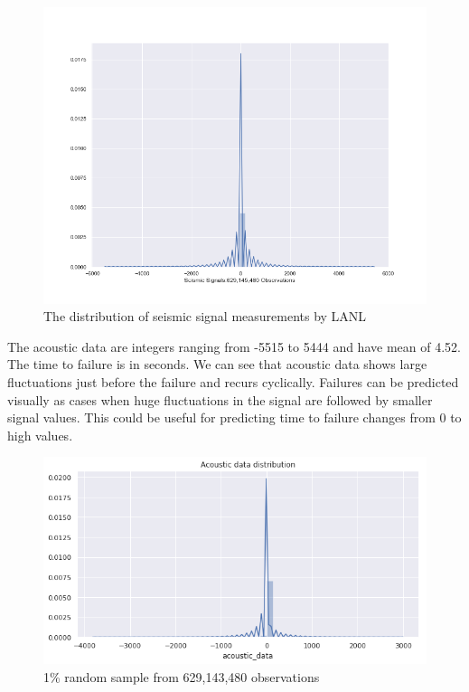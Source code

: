 \documentclass[]{llncs}
\begin{document}
\begin{figure}
	\centering
	\includegraphics[width=.8\linewidth]{../GPUProject/acousticRand60000DistPlot}
	\caption{The distribution of seismic signal measurements by LANL}
	\label{fig:acousticRand60000DistPlot}
\end{figure}
The acoustic data are integers ranging from -5515 to 5444 and have mean of 4.52. The time to failure is in seconds. We can see that acoustic data shows large fluctuations just before the failure and recurs cyclically. Failures can be predicted visually as cases when huge fluctuations in the signal are followed by smaller signal values. This could be useful for predicting time to failure changes from 0 to high values.
\begin{figure}[h]
	\centering
	\includegraphics[width=0.7\linewidth]{../GPUProject/acousticFeatureIntegers}
	\caption[]{1\% random sample from 629,143,480 observations}
	\label{fig:acousticfeatureintegers}
\end{figure}
\end{document}

